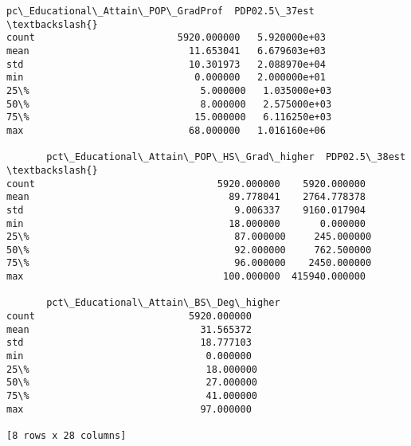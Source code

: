 \documentclass[11pt]{article}
\begin{document}
\begin{Verbatim}[commandchars=\\\{\}]
       pc\_Educational\_Attain\_POP\_GradProf  PDP02.5\_37est  \textbackslash{}
count                         5920.000000   5.920000e+03   
mean                            11.653041   6.679603e+03   
std                             10.301973   2.088970e+04   
min                              0.000000   2.000000e+01   
25\%                              5.000000   1.035000e+03   
50\%                              8.000000   2.575000e+03   
75\%                             15.000000   6.116250e+03   
max                             68.000000   1.016160e+06   

       pct\_Educational\_Attain\_POP\_HS\_Grad\_higher  PDP02.5\_38est  \textbackslash{}
count                                5920.000000    5920.000000   
mean                                   89.778041    2764.778378   
std                                     9.006337    9160.017904   
min                                    18.000000       0.000000   
25\%                                    87.000000     245.000000   
50\%                                    92.000000     762.500000   
75\%                                    96.000000    2450.000000   
max                                   100.000000  415940.000000   

       pct\_Educational\_Attain\_BS\_Deg\_higher  
count                           5920.000000  
mean                              31.565372  
std                               18.777103  
min                                0.000000  
25\%                               18.000000  
50\%                               27.000000  
75\%                               41.000000  
max                               97.000000  

[8 rows x 28 columns]

    \end{Verbatim}
\end{document}
